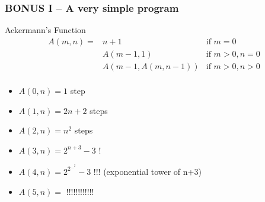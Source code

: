 \documentclass{beamer}
\begin{document}
\begin{frame}
  \frametitle{BONUS I -- A very simple program}

  \begin{block}{Ackermann's Function}
    \begin{eqnarray*}
      A(m,n) = & n+1 & \text{if } m = 0\\
      & A(m-1,1) & \text{if } m > 0, n = 0\\
      & A(m-1,A(m,n-1)) & \text{if } m > 0, n > 0\\
    \end{eqnarray*}
  \end{block}
  
  \begin{itemize}
    \item $A(0,n) = 1$ step
    \item $A(1,n) = 2n+2$ steps
    \item $A(2,n) = n^2$ steps
    \item $A(3,n) = 2^{n+3}-3$ \alert{!}
    \item $A(4,n) = 2^{2^{...^2}}-3$ \alert{!!!} (exponential tower of n+3)
    \item $A(5,n) = $ \alert{!!!!!!!!!!!!}
  \end{itemize}
\end{frame}
\end{document}
